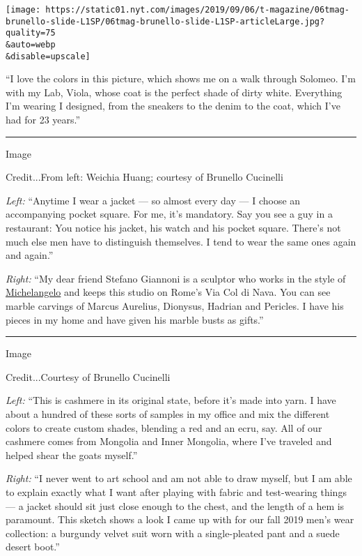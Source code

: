 \texttt{[image: https://static01.nyt.com/images/2019/09/06/t-magazine/06tmag-brunello-slide-L1SP/06tmag-brunello-slide-L1SP-articleLarge.jpg?quality=75\\\&auto=webp\\\&disable=upscale]}

``I love the colors in this picture, which shows me on a walk through
Solomeo. I'm with my Lab, Viola, whose coat is the perfect shade of
dirty white. Everything I'm wearing I designed, from the sneakers to the
denim to the coat, which I've had for 23 years.''

\begin{center}\rule{0.5\linewidth}{\linethickness}\end{center}

Image

Credit...From left: Weichia Huang; courtesy of Brunello Cucinelli

\emph{Left:} ``Anytime I wear a jacket --- so almost every day --- I
choose an accompanying pocket square. For me, it's mandatory. Say you
see a guy in a restaurant: You notice his jacket, his watch and his
pocket square. There's not much else men have to distinguish themselves.
I tend to wear the same ones again and again.''

\emph{Right:} ``My dear friend Stefano Giannoni is a sculptor who works
in the style of
\href{https://www.nytimes.com/topic/person/michelangelo-buonarroti}{Michelangelo}
and keeps this studio on Rome's Via Col di Nava. You can see marble
carvings of Marcus Aurelius, Dionysus, Hadrian and Pericles. I have his
pieces in my home and have given his marble busts as gifts.''

\begin{center}\rule{0.5\linewidth}{\linethickness}\end{center}

Image

Credit...Courtesy of Brunello Cucinelli

\emph{Left:} ``This is cashmere in its original state, before it's made
into yarn. I have about a hundred of these sorts of samples in my office
and mix the different colors to create custom shades, blending a red and
an ecru, say. All of our cashmere comes from Mongolia and Inner
Mongolia, where I've traveled and helped shear the goats myself.''

\emph{Right:} ``I never went to art school and am not able to draw
myself, but I am able to explain exactly what I want after playing with
fabric and test-wearing things --- a jacket should sit just close enough
to the chest, and the length of a hem is paramount. This sketch shows a
look I came up with for our fall 2019 men's wear collection: a burgundy
velvet suit worn with a single-pleated pant and a suede desert boot.''

